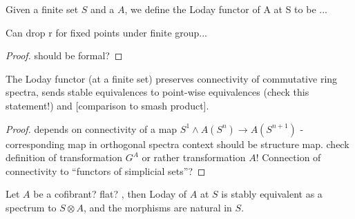     \begin{defn}\label{def_loday_functor_finite_sets}
      Given a finite set $S$ and a \hring $A$, we define the Loday functor of A at S to be ...
    \end{defn}

    \begin{lem}\label{lem_loday_functor_fixed_points}
      Can drop r for fixed points under finite group...
      \begin{proof}
        should be formal?
      \end{proof}
    \end{lem}

    \begin{lem}\label{lem_loday_functor_preserves_connectivity}
      The Loday functor (at a finite set) preserves connectivity of commutative ring spectra, sends stable equivalences to point-wise equivalences (check this statement!) and [comparison to smash product].
      \begin{proof}
        depends on connectivity of a map $S^1 \wedge A(S^n) \to A(S^{n+1})$ - corresponding map in orthogonal spectra context should be structure map. check definition of transformation $G^A$ or rather transformation $A$! Connection of connectivity to ``functors of simplicial sets''?
      \end{proof}
    \end{lem}

    \begin{cor}\label{cor_loday_at_S_naturally_equivalent_to_tensor_with_S}
      Let $A$ be a cofibrant? flat? \hring, then Loday of $A$ at $S$ is stably equivalent as a spectrum to $S \otimes A$, and the morphisms are natural in $S$.
    \end{cor}


